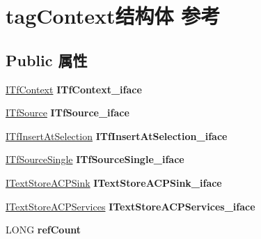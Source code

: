 \hypertarget{structtag_context}{}\section{tag\+Context结构体 参考}
\label{structtag_context}
\subsection*{Public 属性}
\begin{DoxyCompactItemize}
\item 
\mbox{\label{structtag_context_ad1eeae174f00f151b5492fc53a41f892}} 
\hyperlink{interface_i_tf_context}{I\+Tf\+Context} {\bfseries I\+Tf\+Context\+\_\+iface}
\item 
\mbox{\label{structtag_context_a49847a138fa60b93e39db8e6c0a44bcc}} 
\hyperlink{interface_i_tf_source}{I\+Tf\+Source} {\bfseries I\+Tf\+Source\+\_\+iface}
\item 
\mbox{\label{structtag_context_a0f0367be39cedd0274a83b2fe234c25e}} 
\hyperlink{interface_i_tf_insert_at_selection}{I\+Tf\+Insert\+At\+Selection} {\bfseries I\+Tf\+Insert\+At\+Selection\+\_\+iface}
\item 
\mbox{\label{structtag_context_a4796ea44ffa1b4ca667851ac308b68c7}} 
\hyperlink{interface_i_tf_source_single}{I\+Tf\+Source\+Single} {\bfseries I\+Tf\+Source\+Single\+\_\+iface}
\item 
\mbox{\label{structtag_context_aa7fea7c3a255869a92ae21b03567737b}} 
\hyperlink{interface_i_text_store_a_c_p_sink}{I\+Text\+Store\+A\+C\+P\+Sink} {\bfseries I\+Text\+Store\+A\+C\+P\+Sink\+\_\+iface}
\item 
\mbox{\label{structtag_context_a8980eadb958d75e8c1fed953dbf2296d}} 
\hyperlink{interface_i_text_store_a_c_p_services}{I\+Text\+Store\+A\+C\+P\+Services} {\bfseries I\+Text\+Store\+A\+C\+P\+Services\+\_\+iface}
\item 
\mbox{\label{structtag_context_a0e67348101802ccfd4ba7ae29c828e37}} 
L\+O\+NG {\bfseries ref\+Count}
\item 
\mbox{\label{structtag_context_a7e94fb8e4f3cd6dd60e8732691e806fc}} 

\end{DoxyCompactItemize}
